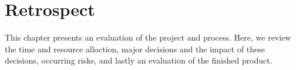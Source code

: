 \chapter{Retrospect}
This chapter presents an evaluation of the project and process. Here, we review the time and resource alloction, major decisions and the impact of these decisions, occurring risks, and lastly an evaluation of the finished product.





